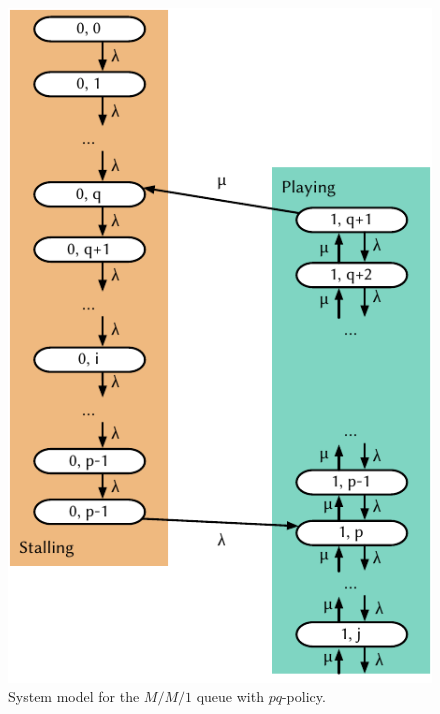 \begin{figure}
  \centering
  \includegraphics{application/qoe_user_behaviour/system_model/figures/state_diagram}
  \caption{System model for the \(M/M/1\) queue with \(pq\)-policy.}
  \label{fig:application:qoue_user_behaviour:system_model:mm1pq:state_diagram}
\end{figure}


